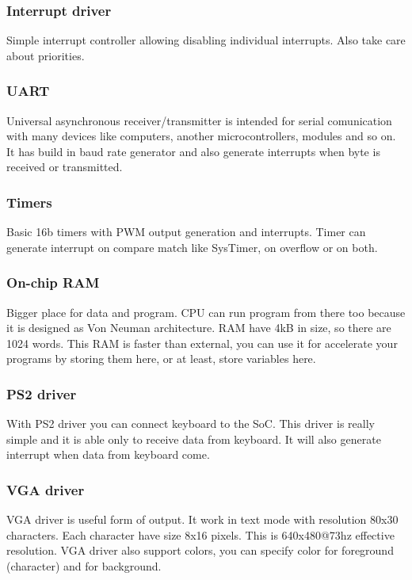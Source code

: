 \subsubsection{Interrupt driver}

Simple interrupt controller allowing disabling individual interrupts. Also take
care about priorities.

\subsubsection{UART}

Universal asynchronous receiver/transmitter is intended for serial comunication
with many devices like computers, another microcontrollers, modules and so on.
It has build in baud rate generator and also generate interrupts when byte is
received or transmitted.

\subsubsection{Timers}

Basic 16b timers with PWM output generation and interrupts. Timer can generate
interrupt on compare match like SysTimer, on overflow or on both.

\subsubsection{On-chip RAM}

Bigger place for data and program. CPU can run program from there too because
it is designed as Von Neuman architecture. RAM have 4kB in size, so there are
1024 words. This RAM is faster than external, you can use it for accelerate your
programs by storing them here, or at least, store variables here.

\subsubsection{PS2 driver}

With PS2 driver you can connect keyboard to the SoC. This driver is really
simple and it is able only to receive data from keyboard. It will also generate
interrupt when data from keyboard come.

\subsubsection{VGA driver}

VGA driver is useful form of output. It work in text mode with resolution 80x30
characters. Each character have size 8x16 pixels. This is 640x480@73hz effective
resolution. VGA driver also support colors, you can specify color for foreground
(character) and for background.
